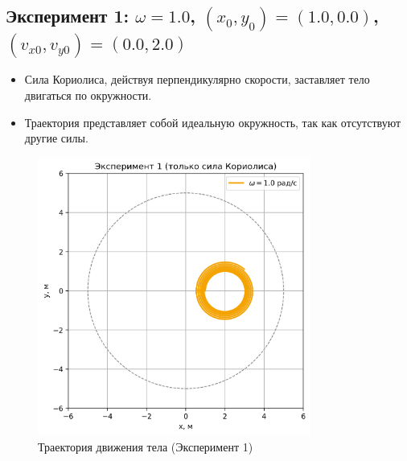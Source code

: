 \documentclass[a4paper,12pt]{article}
\begin{document}
\subsection*{Эксперимент 1: $\omega = 1.0$, $(x_0, y_0) = (1.0, 0.0)$, $(v_{x0}, v_{y0}) = (0.0, 2.0)$}
\begin{itemize}
    \item Сила Кориолиса, действуя перпендикулярно скорости, заставляет тело двигаться по окружности.
    \item Траектория представляет собой идеальную окружность, так как отсутствуют другие силы.
\end{itemize}
\begin{figure}[H]
    \centering
    \includegraphics[width=0.8\textwidth]{plots_coriolis_only/experiment_1.png}
    \caption{Траектория движения тела (Эксперимент 1)}
\end{figure}

\newpage
\end{document}
